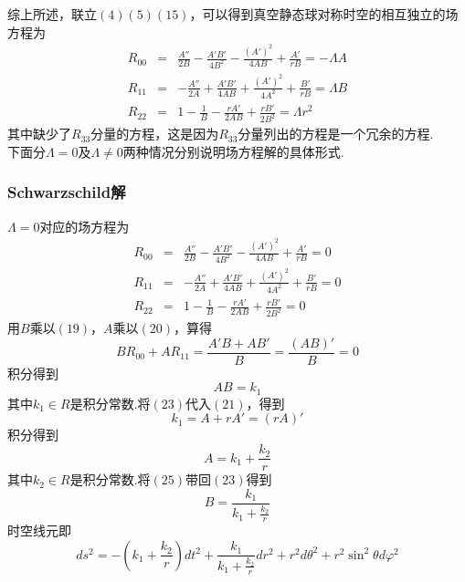         综上所述，联立$(4)(5)(15)$，可以得到真空静态球对称时空的相互独立的场方程为
        \begin{eqnarray}
            R_{00}&=&\frac{A''}{2B}-\frac{A'B'}{4B^2}-\frac{(A')^2}{4AB}+\frac{A'}{rB}=-\Lambda A\\
            R_{11}&=&-\frac{A''}{2A}+\frac{A'B'}{4AB}+\frac{(A')^2}{4A^2}+\frac{B'}{rB}=\Lambda B\\
            R_{22}&=&1-\frac{1}{B}-\frac{rA'}{2AB}+\frac{rB'}{2B^2}=\Lambda r^2
        \end{eqnarray}
        其中缺少了$R_{33}$分量的方程，这是因为$R_{33}$分量列出的方程是一个冗余的方程.\\
        
        
        下面分$\Lambda=0$及$\Lambda\ne0$两种情况分别说明场方程解的具体形式.
        \subsubsection{Schwarzschild解}
        $\Lambda=0$对应的场方程为
        \begin{eqnarray}
            R_{00}&=&\frac{A''}{2B}-\frac{A'B'}{4B^2}-\frac{(A')^2}{4AB}+\frac{A'}{rB}=0\\
            R_{11}&=&-\frac{A''}{2A}+\frac{A'B'}{4AB}+\frac{(A')^2}{4A^2}+\frac{B'}{rB}=0\\
            R_{22}&=&1-\frac{1}{B}-\frac{rA'}{2AB}+\frac{rB'}{2B^2}=0
        \end{eqnarray}
        用$B$乘以$(19)$，$A$乘以$(20)$，算得
        \begin{equation}
            BR_{00}+AR_{11}=\frac{A'B+AB'}{B}=\frac{(AB)'}{B}=0
        \end{equation}
        积分得到
        \begin{equation}
            AB=k_1
        \end{equation}
        其中$k_1\in R$是积分常数.将$(23)$代入$(21)$，得到
        \begin{equation}
            k_1=A+rA'=(rA)'
        \end{equation}
        积分得到
        \begin{equation}
            A=k_1+\frac{k_2}{r}
        \end{equation}
        其中$k_2\in R$是积分常数.将$(25)$带回$(23)$得到
        \begin{equation}
            B=\frac{k_1}{k_1+\frac{k_2}{r}}
        \end{equation}
        时空线元即
        \begin{equation}
            ds^2=-\left(k_1+\frac{k_2}{r}\right)dt^2+\frac{k_1}{k_1+\frac{k_2}{r}}dr^2+r^2d\theta^2+r^2\sin^2\theta d\varphi^2
        \end{equation}
